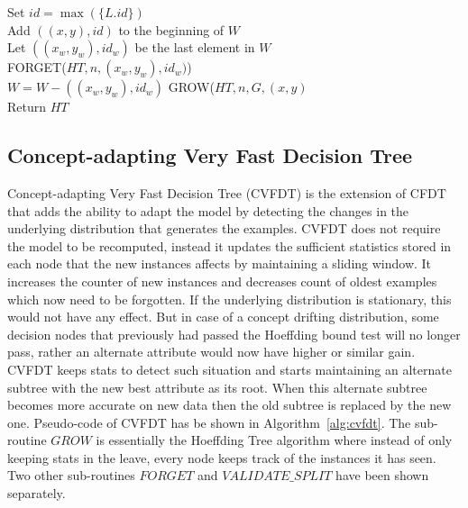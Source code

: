 \begin{algorithm}[htbp]
{{            Set $id = \max(\{L.id\})$ \\
            Add $((x, y), id)$ to the beginning of $W$ \\
             {
                Let $((x_w, y_w), id_w)$ be the last element in $W$ \\
                FORGET($HT, n, (x_w, y_w), id_w)$) \label{algln:cvfdt:forget} \\
                $W = W - ((x_w, y_w), id_w)$
            }
            GROW($HT, n, G, (x,y)$ \\
        }
        Return $HT$
    }
\end{algorithm}
\subsection{Concept-adapting Very Fast Decision Tree}
Concept-adapting Very Fast Decision Tree (CVFDT) is the extension of CFDT that adds the ability to adapt the model by detecting the changes in the underlying distribution that generates the examples. CVFDT does not require the model to be recomputed, instead it updates the sufficient statistics stored in each node that the new instances affects by maintaining a sliding window. It increases the counter of new instances and decreases count of oldest examples which now need to be forgotten. If the underlying distribution is stationary, this would not have any effect. But in case of a concept drifting distribution, some decision nodes that previously had passed the Hoeffding bound test will no longer pass, rather an alternate attribute would now have higher or similar gain. CVFDT keeps stats to detect such situation and starts maintaining an alternate subtree with the new best attribute as its root. When this alternate subtree becomes more accurate on new data then the old subtree is replaced by the new one. Pseudo-code of CVFDT has be shown in Algorithm~\ref{alg:cvfdt}. The sub-routine $GROW$ is essentially the Hoeffding Tree algorithm where instead of only keeping stats in the leave, every node keeps track of the instances it has seen. Two other sub-routines $FORGET$ and $VALIDATE\_SPLIT$ have been shown separately.

